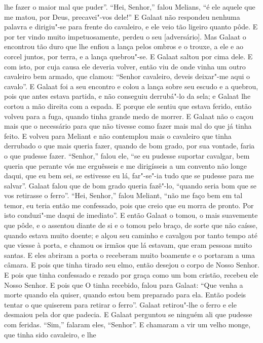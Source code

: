 lhe fazer o maior mal que puder”. “Hei, Senhor,” falou Melians, “é ele aquele
que me matou, por Deus, precavei"-vos dele!” E Galaat não respondeu nenhuma
palavra e dirigiu"-se para frente do cavaleiro, e ele veio tão ligeiro quanto
pôde. E por ter vindo muito impetuosamente, perdeu o seu [adversário]. Mas
Galaat o encontrou tão duro que lhe enfiou a lança pelos ombros e o trouxe, a
ele e ao corcel juntos, por terra, e a lança quebrou"-se. E Galaat saltou por
cima dele. E com isto, por cuja causa ele deveria volver, então viu de onde
vinha um outro cavaleiro bem armado, que clamou: “Senhor cavaleiro, deveis
deixar"-me aqui o cavalo”. E Galaat foi a seu encontro e colou a lança sobre seu
escudo e a quebrou, pois que antes estava partida, e não conseguiu derrubá"-lo
da sela; e Galaat lhe cortou a mão direita com a espada. E porque ele sentiu
que estava ferido, então volveu para a fuga, quando tinha grande medo de
morrer. E Galaat não o caçou mais que o necessário para que não tivesse como
fazer mais mal do que já tinha feito. E volveu para Meliant e não contemplou
mais o cavaleiro que tinha derrubado o que mais queria fazer, quando de bom
grado, por sua vontade, faria o que pudesse fazer. “Senhor,” falou ele, “se eu
pudesse suportar cavalgar, bem queria que perante vós me erguêsseis e me
dirigísseis a um convento não longe daqui, que eu bem sei, se estivesse eu lá,
far"-se"-ia tudo que se pudesse para me salvar”. Galaat falou que de bom grado
queria fazê"-lo, “quando seria bom que se vos retirasse o ferro”. “Hei, Senhor,”
falou Meliant, “não me faço bem em tal temor, eu teria então me confessado,
pois que creio que eu morra de pronto. Por isto conduzi"-me daqui de imediato”.
E então Galaat o tomou, o mais suavemente que pôde, e o assentou diante de si e
o tomou pelo braço, de sorte que não caísse, quando estava muito doente; e
alçou seu caminho e cavalgou por tanto tempo até que viesse à porta, e chamou
os irmãos que lá estavam, que eram pessoas muito santas. E eles abriram a porta
o receberam muito boamente e o portaram a uma câmara. E pois que tinha tirado
seu elmo, então desejou o corpo de Nosso Senhor. E pois que tinha confessado e
rezado por graça como um bom cristão, recebeu ele Nosso Senhor. E pois que O
tinha recebido, falou para Galaat: ``Que venha a morte quando ela quiser, quando
estou bem preparado para ela. Então podeis tentar o que quiserem para retirar o
ferro”. Galaat retirou"-lhe o ferro e ele desmaiou pela dor que padecia. E
Galaat perguntou se ninguém ali que pudesse com feridas. “Sim,” falaram eles,
“Senhor”. E chamaram a vir um velho monge, que tinha sido cavaleiro, e lhe

